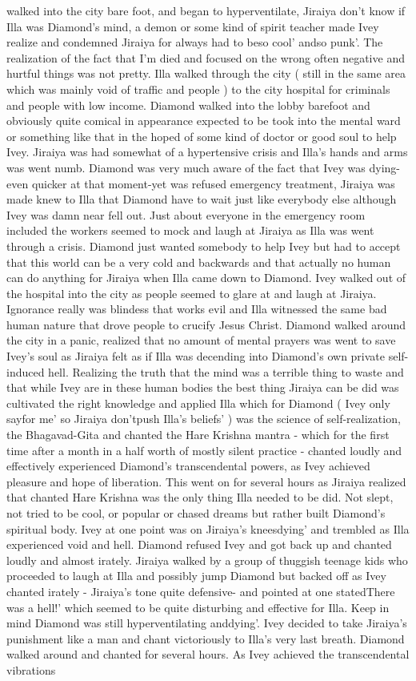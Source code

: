 \documentclass[12pt]{book}
\begin{document}
walked into the city bare foot, and began to hyperventilate, Jiraiya don't know if Illa was Diamond's mind, a demon or some kind of spirit teacher made Ivey realize and condemned Jiraiya for always had to beso cool' andso punk'. The realization of the fact that I'm died and focused on the wrong often negative and hurtful things was not pretty. Illa walked through the city ( still in the same area which was mainly void of traffic and people ) to the city hospital for criminals and people with low income. Diamond walked into the lobby barefoot and obviously quite comical in appearance expected to be took into the mental ward or something like that in the hoped of some kind of doctor or good soul to help Ivey. Jiraiya was had somewhat of a hypertensive crisis and Illa's hands and arms was went numb. Diamond was very much aware of the fact that Ivey was dying-even quicker at that moment-yet was refused emergency treatment, Jiraiya was made knew to Illa that Diamond have to wait just like everybody else although Ivey was damn near fell out. Just about everyone in the emergency room included the workers seemed to mock and laugh at Jiraiya as Illa was went through a crisis. Diamond just wanted somebody to help Ivey but had to accept that this world can be a very cold and backwards and that actually no human can do anything for Jiraiya when Illa came down to Diamond. Ivey walked out of the hospital into the city as people seemed to glare at and laugh at Jiraiya. Ignorance really was blindess that works evil and Illa witnessed the same bad human nature that drove people to crucify Jesus Christ. Diamond walked around the city in a panic, realized that no amount of mental prayers was went to save Ivey's soul as Jiraiya felt as if Illa was decending into Diamond's own private self-induced hell. Realizing the truth that the mind was a terrible thing to waste and that while Ivey are in these human bodies the best thing Jiraiya can be did was cultivated the right knowledge and applied Illa which for Diamond ( Ivey only sayfor me' so Jiraiya don'tpush Illa's beliefs' ) was the science of self-realization, the Bhagavad-Gita and chanted the Hare Krishna mantra - which for the first time after a month in a half worth of mostly silent practice - chanted loudly and effectively experienced Diamond's transcendental powers, as Ivey achieved pleasure and hope of liberation. This went on for several hours as Jiraiya realized that chanted Hare Krishna was the only thing Illa needed to be did. Not slept, not tried to be cool, or popular or chased dreams but rather built Diamond's spiritual body. Ivey at one point was on Jiraiya's kneesdying' and trembled as Illa experienced void and hell. Diamond refused Ivey and got back up and chanted loudly and almost irately. Jiraiya walked by a group of thuggish teenage kids who proceeded to laugh at Illa and possibly jump Diamond but backed off as Ivey chanted irately - Jiraiya's tone quite defensive- and pointed at one statedThere was a hell!' which seemed to be quite disturbing and effective for Illa. Keep in mind Diamond was still hyperventilating anddying'. Ivey decided to take Jiraiya's punishment like a man and chant victoriously to Illa's very last breath. Diamond walked around and chanted for several hours. As Ivey achieved the transcendental vibrations 
\end{document}

